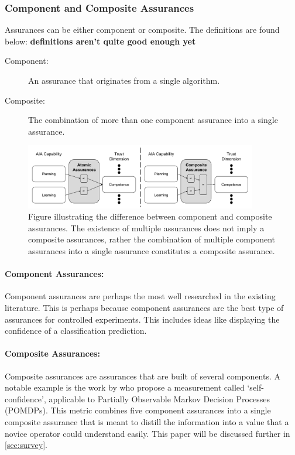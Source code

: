 \subsubsection{Component and Composite Assurances}
Assurances can be either component or composite. The definitions are found below: \textbf{definitions aren't quite good enough yet}

\begin{description}
    \item [Component:] An assurance that originates from a single algorithm.
    \item [Composite:] The combination of more than one component assurance into a single assurance. 
\end{description}

\begin{figure}[!htbp]
    \centering
    \includegraphics[width=0.9\textwidth]{Figures/Assurance_component_composite.pdf}
    \caption{Figure illustrating the difference between component and composite assurances. The existence of multiple assurances does not imply a composite assurances, rather the combination of multiple component assurances into a single assurance constitutes a composite assurance.}
    \label{fig:assurance_mapping}
\end{figure}

\paragraph{Component Assurances:} Component assurances are perhaps the most well researched in the existing literature. This is perhaps because component assurances are the best type of assurances for controlled experiments. This includes ideas like displaying the confidence of a classification prediction.

\paragraph{Composite Assurances:} Composite assurances are assurances that are built of several components. A notable example is the work by \citet{Aitken2016-cv} who propose a measurement called `self-confidence', applicable to Partially Observable Markov Decision Processes (POMDPs). This metric combines five component assurances into a single composite assurance that is meant to distill the information into a value that a novice operator could understand easily. This paper will be discussed further in \ref{sec:survey}. 
